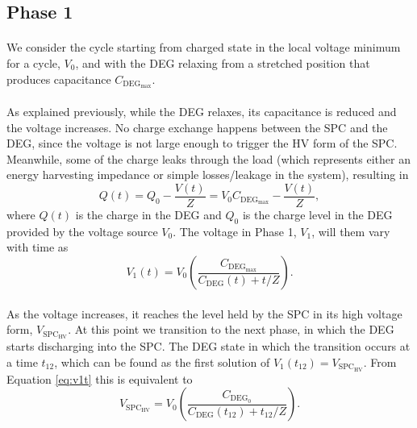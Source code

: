 \subsection{Phase 1}

\paragraph{}  We consider the cycle starting from charged state in the local voltage minimum for a cycle, $V_0$, and with the DEG relaxing from a stretched position that produces capacitance $C_{\text{DEG}_\text{max}}$.

\paragraph{} As explained previously, while the DEG relaxes, its capacitance is reduced and the voltage increases. No charge exchange happens between the SPC and the DEG, since the voltage is not large enough to trigger the HV form of the SPC. Meanwhile, some of the charge leaks  through the load (which represents either an energy harvesting impedance or simple losses/leakage in the system), resulting in
\begin{equation}
Q(t) = Q_0-\frac{V(t)}{Z} = V_0C_{\text{DEG}_\text{max}}-\frac{V(t)}{Z},
\end{equation}
where $Q(t)$ is the charge in the DEG and $Q_0$ is the charge level in the DEG provided by the voltage source $V_0$.  The voltage in Phase 1, $V_1$, will them vary with time as
\begin{equation}\label{eq:v1t}
V_{1}(t) = V_0\left(\frac{C_{\text{DEG}_\text{max}}}{C_\text{DEG}(t)+t/Z}\right).
\end{equation}


\paragraph{} As the voltage increases, it reaches the level held by the SPC in its high voltage form, $V_{\text{SPC}_\text{HV}}$. At this point we transition to the next phase, in which the DEG starts discharging into the SPC. The DEG state in which the transition occurs at a time $t_{12}$, which can be found as the first solution of  $V_1(t_{12}) = V_{\text{SPC}_\text{HV}}$. From Equation \ref{eq:v1t} this is equivalent to
\begin{equation}
V_{\text{SPC}_\text{HV}} = V_0\left(\frac{C_{\text{DEG}_0}}{C_\text{DEG}(t_{12})+t_{12}/Z}\right).
\end{equation}


